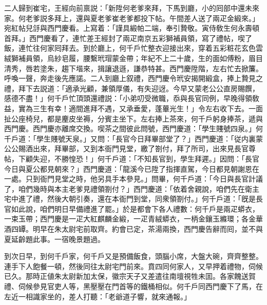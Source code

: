 二人歸到崔宅，王經向前禀説：「新陞何老爹來拜，下馬到廳，小的囘部中還未來家。何老爹説多拜上，還與夏老爹崔老爹都投下帖。午間差人送了兩疋金緞來。」宛紅帖兒㧱與西門慶看。上寫着：「謹具緞帕二端，奉引贄敬。寅侍敎生何永壽頓首拜。」西門慶看了，連忙差王經封了兩疋南京五彩獅補員領，寫了禮帖，喫了飯，連忙往何家囘拜去。到於廳上，何千戶忙整衣迎接出來，穿着五彩粧花玄色雲絨獅補員領，烏紗皂履，腰繫玳瑁蒙金帶；年紀不上二十歲，生的面如傅粉，眉目清秀，唇若塗朱，趨下堦來，揖讓退遜，謙恭特甚。西門慶陞階，左右忙去掀簾。呼喚一聲，奔走後先應諾。二人到廳上叙禮，西門慶令玳安揭開緞盒，捧上贄見之禮，拜下去説道：「適承光顧，兼領厚儀，有失迎迓。今早又蒙老公公直房賜饌，感德不盡！」何千戶忙頂頭還禮説：「小弟叨受微職，忝與長官同例，早晚得領敎益，實為三生有幸！適間進拜不遇，又承垂愛，蓬蓽光生！」令左右收下去。一面扯公座椅兒，都是麈皮坐褥，分賓主坐下。左右捧上茶來，何千戶躬身捧茶，遞與西門慶。西門慶亦離席交換。喫茶之間彼此問號，西門慶道：「學生賤號四泉。」何千戶道：「學生賤號天泉。」又問：「長官今日拜畢部堂了？」西門慶道：「従内裏蒙公公賜酒出來，拜畢部，又到本衙門見堂，繳了劄付，拜了所司，出來見長官尊帖，下顧失迎，不勝惶恐！」何千戶道：「不知長官到，學生拜遲。」因問：「長官今日與夏公都見朝來？」西門慶道：「龍溪今已陞了指揮直駕，今日都見朝謝恩在一處。只到衙門見堂之時，他另具手本參見。」問畢，何千戶道：「今日與長官計議了，咱們幾時與本主老爹見禮領劄付？」西門慶道：「依着舍親說，咱們先在衛主宅中進了禮，然後大朝引奏，還在本衙門到堂，同衆領劄付。」何千戶道：「旣是長官如此說，咱們明日早備禮進了罷。」於是都會下各人禮數：何千戶是兩疋蟒衣，一束玉帶；西門慶是一疋大紅麒麟金緞，一疋青絨蟒衣，一柄金鑲玉縧環；各金華酒四罈。明早在朱太尉宅前取齊。約會已定，茶湯兩換，西門慶告辭而囘，並不與夏延齡題此事。一宿晚景題過。

到次日早，到何千戶家，何千戶又是預備飯食，頭腦小席，大盤大碗，齊齊整整。連手下人飽餐一頓，然後同往太尉宅門前來。賁四同何家人，又早押着禮物，伺候已久。那時正値朱太尉新加太保，徽宗天子又差遣往南壇視牲未囬。各家餽送賀禮、伺候參見官吏人等，黑壓壓在門首等的鐵桶相似。何千戶同西門慶下了馬，在左近一相識家坐的，差人打聽：「老爺道子響，就來通報。」

